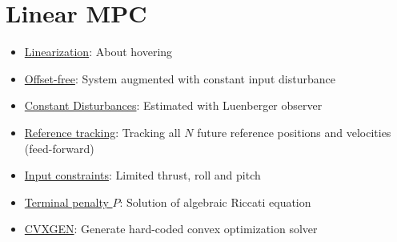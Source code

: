 \ETHslide
\section*{Linear MPC}
\vspace*{\fill}

\begin{itemize}
\item[\ETHitem] \underline{Linearization}: About hovering
\item[\ETHitem] \underline{Offset-free}: System augmented with constant input disturbance 
\item[\ETHitem] \underline{Constant Disturbances}: Estimated with Luenberger observer
\item[\ETHitem] \underline{Reference tracking}: Tracking all $N$ future reference positions and velocities (feed-forward)
\item[\ETHitem] \underline{Input constraints}: Limited thrust, roll and pitch
\item[\ETHitem] \underline{Terminal penalty $P$}: Solution of algebraic Riccati equation
\item[\ETHitem] \underline{CVXGEN}: Generate hard-coded convex optimization solver
\end{itemize}

\vspace*{\fill}
\clearpage
